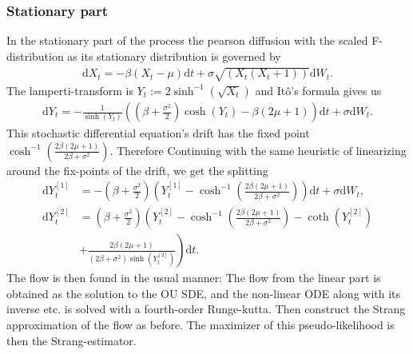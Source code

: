 \subsubsection{Stationary part}
In the stationary part of the process the pearson diffusion with the scaled F-distribution as its stationary distribution is governed by
\begin{align}
    \mathrm{d}X_t = -\beta\left(X_t - \mu\right)\mathrm{d}t + \sigma \sqrt{\left(X_t\left(X_t + 1\right)\right)}\mathrm{d}W_t.
\end{align}
The lamperti-transform is $Y_t := 2 \sinh^{-1}\left(\sqrt{X_t}\right)$ and Itô's formula gives us
\begin{align}
    \mathrm{d}Y_t = - \frac{1}{\sinh(Y_t)}\left(\left(\beta + \frac{\sigma^2}{2}\right)\cosh(Y_t) - \beta\left(2\mu + 1\right)\right) \mathrm{d}t + \sigma \mathrm{d}W_t.
\end{align}
This stochastic differential equation's drift has the fixed point $\cosh^{-1}\left(\frac{2\beta\left(2\mu + 1\right)}{2\beta + \sigma^2}\right)$.
Therefore Continuing with the same heuristic of linearizing around the fix-points of the drift, we get the splitting
\begin{align}
    \mathrm{d}Y_t^{[1]} &= -\left(\beta + \frac{\sigma^2}{2}\right)\left(Y_t^{[1]} - \cosh^{-1}\left(\frac{2\beta\left(2\mu + 1\right)}{2\beta + \sigma^2}\right)\right)\mathrm{d}t + \sigma \mathrm{d}W_t, \\
    \mathrm{d}Y_t^{[2]} &= \left(\beta + \frac{\sigma^2}{2}\right) \left(Y_t^{[2]} - \cosh^{-1}\left(\frac{2\beta\left(2\mu + 1\right)}{2\beta + \sigma^2}\right) - \coth\left(Y_t^{[2]}\right) \right.\nonumber\\
    &+ \left. \frac{2\beta\left(2\mu + 1\right)}{\left(2\beta + \sigma^2\right)\sinh(Y_t^{[2]})}\right)\mathrm{d}t.
\end{align}
The flow is then found in the usual manner: The flow from the linear part is obtained as the solution to the OU SDE, and the non-linear ODE along with its inverse etc. is solved with a fourth-order Runge-kutta. Then construct the Strang approximation of the flow as before. The maximizer of this pseudo-likelihood is then the Strang-estimator.  
